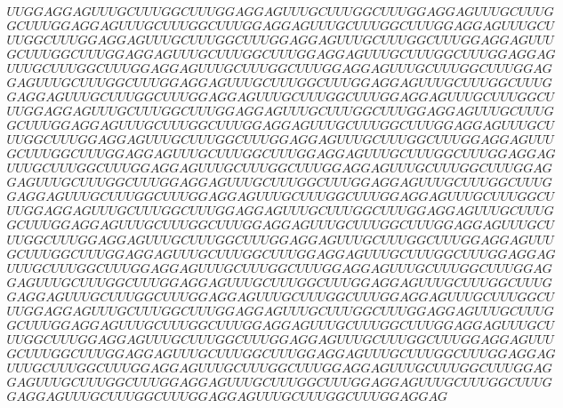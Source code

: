 \documentclass[a4paper, 18pt]{book} %
\begin{document}
\begin{multline}
UUGGAGGAGUUUGCUUUGGCUUUGGAGGAGUUUGCUUUGGCUUUGGAGGAGUUUGCUUUG\\
GCUUUGGAGGAGUUUGCUUUGGCUUUGGAGGAGUUUGCUUUGGCUUUGGAGGAGUUUGCU\\
UUGGCUUUGGAGGAGUUUGCUUUGGCUUUGGAGGAGUUUGCUUUGGCUUUGGAGGAGUUU\\
GCUUUGGCUUUGGAGGAGUUUGCUUUGGCUUUGGAGGAGUUUGCUUUGGCUUUGGAGGAG\\
UUUGCUUUGGCUUUGGAGGAGUUUGCUUUGGCUUUGGAGGAGUUUGCUUUGGCUUUGGAG\\
GAGUUUGCUUUGGCUUUGGAGGAGUUUGCUUUGGCUUUGGAGGAGUUUGCUUUGGCUUUG\\
GAGGAGUUUGCUUUGGCUUUGGAGGAGUUUGCUUUGGCUUUGGAGGAGUUUGCUUUGGCU\\
UUGGAGGAGUUUGCUUUGGCUUUGGAGGAGUUUGCUUUGGCUUUGGAGGAGUUUGCUUUG\\
GCUUUGGAGGAGUUUGCUUUGGCUUUGGAGGAGUUUGCUUUGGCUUUGGAGGAGUUUGCU\\
UUGGCUUUGGAGGAGUUUGCUUUGGCUUUGGAGGAGUUUGCUUUGGCUUUGGAGGAGUUU\\
GCUUUGGCUUUGGAGGAGUUUGCUUUGGCUUUGGAGGAGUUUGCUUUGGCUUUGGAGGAG\\
UUUGCUUUGGCUUUGGAGGAGUUUGCUUUGGCUUUGGAGGAGUUUGCUUUGGCUUUGGAG\\
GAGUUUGCUUUGGCUUUGGAGGAGUUUGCUUUGGCUUUGGAGGAGUUUGCUUUGGCUUUG\\
GAGGAGUUUGCUUUGGCUUUGGAGGAGUUUGCUUUGGCUUUGGAGGAGUUUGCUUUGGCU\\
UUGGAGGAGUUUGCUUUGGCUUUGGAGGAGUUUGCUUUGGCUUUGGAGGAGUUUGCUUUG\\
GCUUUGGAGGAGUUUGCUUUGGCUUUGGAGGAGUUUGCUUUGGCUUUGGAGGAGUUUGCU\\
UUGGCUUUGGAGGAGUUUGCUUUGGCUUUGGAGGAGUUUGCUUUGGCUUUGGAGGAGUUU\\
GCUUUGGCUUUGGAGGAGUUUGCUUUGGCUUUGGAGGAGUUUGCUUUGGCUUUGGAGGAG\\
UUUGCUUUGGCUUUGGAGGAGUUUGCUUUGGCUUUGGAGGAGUUUGCUUUGGCUUUGGAG\\
GAGUUUGCUUUGGCUUUGGAGGAGUUUGCUUUGGCUUUGGAGGAGUUUGCUUUGGCUUUG\\
GAGGAGUUUGCUUUGGCUUUGGAGGAGUUUGCUUUGGCUUUGGAGGAGUUUGCUUUGGCU\\
UUGGAGGAGUUUGCUUUGGCUUUGGAGGAGUUUGCUUUGGCUUUGGAGGAGUUUGCUUUG\\
GCUUUGGAGGAGUUUGCUUUGGCUUUGGAGGAGUUUGCUUUGGCUUUGGAGGAGUUUGCU\\
UUGGCUUUGGAGGAGUUUGCUUUGGCUUUGGAGGAGUUUGCUUUGGCUUUGGAGGAGUUU\\
GCUUUGGCUUUGGAGGAGUUUGCUUUGGCUUUGGAGGAGUUUGCUUUGGCUUUGGAGGAG\\
UUUGCUUUGGCUUUGGAGGAGUUUGCUUUGGCUUUGGAGGAGUUUGCUUUGGCUUUGGAG\\
GAGUUUGCUUUGGCUUUGGAGGAGUUUGCUUUGGCUUUGGAGGAGUUUGCUUUGGCUUUG\\
GAGGAGUUUGCUUUGGCUUUGGAGGAGUUUGCUUUGGCUUUGGAGGAG
\end{multline}
\Large
\end{document}
